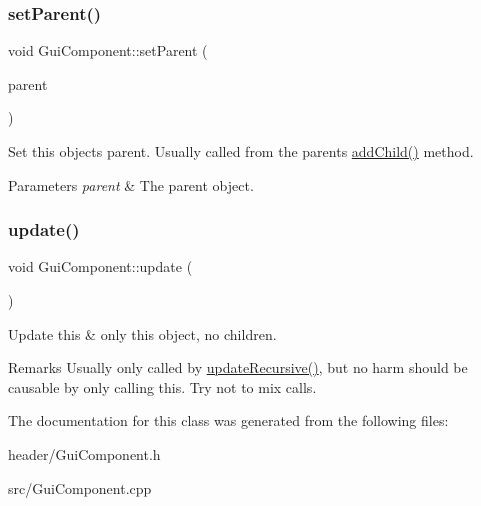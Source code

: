 \subsubsection{\texorpdfstring{set\+Parent()}{setParent()}}
{\footnotesize\ttfamily void Gui\+Component\+::set\+Parent (\begin{DoxyParamCaption}\item[{\mbox{\hyperlink{class_gui_component}{Gui\+Component}} $\ast$}]{parent }\end{DoxyParamCaption})}



Set this object\textquotesingle{}s parent. Usually called from the parent\textquotesingle{}s \mbox{\hyperlink{class_gui_component_a5bccaccef3d0eab8af3be84cab1300de}{add\+Child()}} method. 


\begin{DoxyParams}{Parameters}
{\em parent} & The parent object. \\
\hline
\end{DoxyParams}
\mbox{\label{class_gui_component_adacaca1d0604e6b93cb22962e60cc285}} 
\subsubsection{\texorpdfstring{update()}{update()}}
{\footnotesize\ttfamily void Gui\+Component\+::update (\begin{DoxyParamCaption}{ }\end{DoxyParamCaption})\hspace{0.3cm}{\ttfamily [virtual]}}



Update this \& only this object, no children. 

\begin{DoxyRemark}{Remarks}
Usually only called by \mbox{\hyperlink{class_gui_component_ac58e20a01f67cf605b069ef853dfab66}{update\+Recursive()}}, but no harm should be causable by only calling this. Try not to mix calls. 
\end{DoxyRemark}


The documentation for this class was generated from the following files\+:\begin{DoxyCompactItemize}
\item 
header/Gui\+Component.\+h\item 
src/Gui\+Component.\+cpp\end{DoxyCompactItemize}

